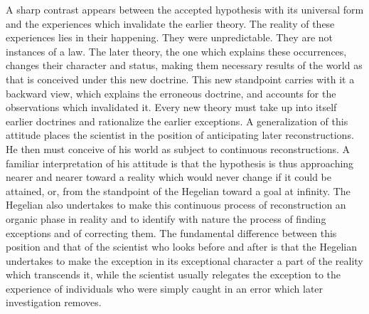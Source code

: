 \documentclass[12pt]{article}
\begin{document}
A sharp contrast appears between the accepted hypothesis
with its universal form and the experiences
which invalidate the earlier theory. The reality of
these experiences lies in their happening. They were
unpredictable. They are not instances of a law. The
later theory, the one which explains these occurrences,
changes their character and status, making them necessary
results of the world as that is conceived under
this new doctrine. This new standpoint carries with it
a backward view, which explains the erroneous doctrine,
and accounts for the observations which invalidated it.
Every new theory must take up into itself earlier
doctrines and rationalize the earlier exceptions.
A generalization of this attitude places the scientist
in the position of anticipating later reconstructions.
He then must conceive of his world as subject to
continuous reconstructions. A familiar interpretation
of his attitude is that the hypothesis is thus
approaching nearer and nearer toward a reality which
would never change if it could be attained, or, from the
standpoint of the Hegelian toward a goal at infinity.
The Hegelian also undertakes to make this continuous
process of reconstruction an organic phase in reality
and to identify with nature the process of finding exceptions
and of correcting them. The fundamental
difference between this position and that of the scientist
who looks before and after is that the Hegelian undertakes
to make the exception in its exceptional character
a part of the reality which transcends it, while the
scientist usually relegates the exception to the experience
of individuals who were simply caught in an error
which later investigation removes.
\end{document}
